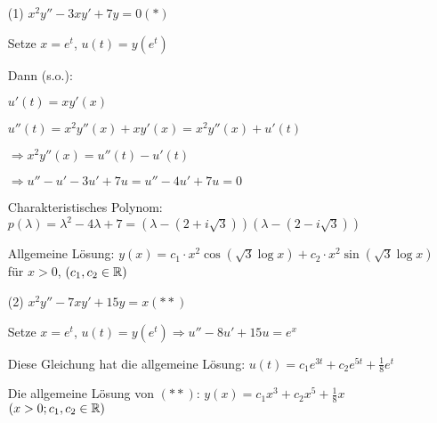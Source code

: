 \documentclass{article}
\begin{document}
\begin{beispiel}
	
\begin{itemize}
	\item [(1)] $x^2 y'' - 3 x y' + 7y = 0 (*)$
	
	Setze $x = e^t$, $u(t) = y(e^t)$
	
	Dann (s.o.):
	
	$u'(t) = x y'(x)$
	
	$u''(t) = x^2 y''(x) + xy'(x) = x^2y''(x) + u'(t)$
	
	$\Rightarrow x^2y''(x) = u''(t) - u'(t)$
	
	$\Rightarrow u'' - u' - 3u' + 7u = u'' - 4u' + 7u = 0$
	
	Charakteristisches Polynom: $p(\lambda) = \lambda^2 - 4 \lambda + 7 = (\lambda-(2+i\sqrt{3}))(\lambda - (2-i\sqrt{3}))$
	
	Allgemeine Lösung: $y(x) = c_1 \cdot x^2 \cos(\sqrt{3} \log x) + c_2 \cdot x^2 \sin (\sqrt{3} \log x)$ für $x > 0$, $(c_1, c_2 \in \mathbb{R})$
	
	\item[(2)] $x^2 y'' - 7x y' + 15 y = x (**)$
	
	Setze $x = e^t$, $u(t) = y(e^t) \Rightarrow u'' - 8u' + 15 u = e^x$
	
	Diese Gleichung hat die allgemeine Lösung: $u(t) = c_1 e^{3t} + c_2 e^{5t} + \frac{1}{8}e^t$
	
	Die allgemeine Lösung von $(**)$: $y(x) = c_1 x^3 + c_2 x^5 + \frac{1}{8} x$ $(x > 0; c_1, c_2 \in \mathbb{R})$
\end{itemize}
\end{beispiel}
\end{document}
